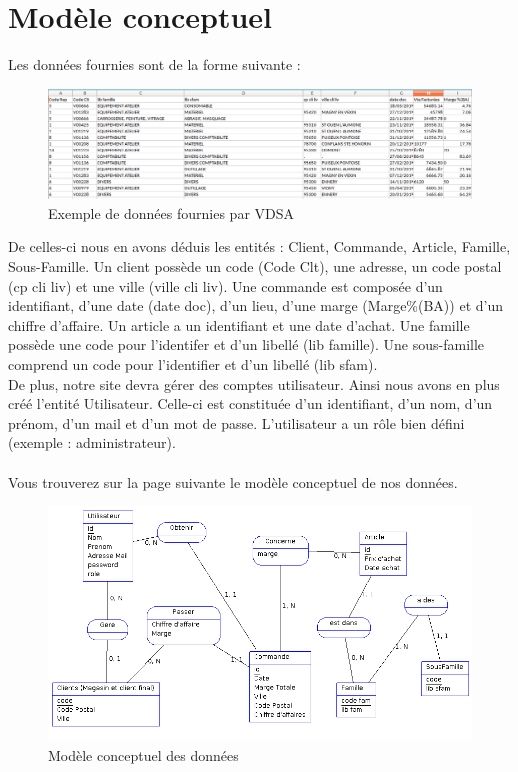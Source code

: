 \section{Modèle conceptuel}

Les données fournies sont de la forme suivante : \\
\begin{figure}[h]
	\begin{center}
		\includegraphics[scale=0.35]{img/data.png}
		\caption{Exemple de données fournies par VDSA}
	\end{center}
\end{figure}

De celles-ci nous en avons déduis les entités : Client, Commande, Article, Famille, Sous-Famille.
Un client possède un code (Code Clt), une adresse, un code postal (cp cli liv) et une ville (ville cli liv). Une commande est composée d'un identifiant, d'une date (date doc), d'un lieu, d'une marge (Marge\%(BA)) et d'un chiffre d'affaire. Un article a un identifiant et une date d'achat. Une famille possède une code pour l'identifer et d'un libellé (lib famille). Une sous-famille comprend un code pour l'identifier et d'un libellé (lib sfam).\\
De plus, notre site devra gérer des comptes utilisateur. Ainsi nous avons en plus créé l'entité Utilisateur. Celle-ci est constituée d'un identifiant, d'un nom, d'un prénom, d'un mail et d'un mot de passe. L'utilisateur a un rôle bien défini (exemple : administrateur).\\ \\
\noindent
Vous trouverez sur la page suivante le modèle conceptuel de nos données.

\begin{figure}[h]

\begin{center}
	\includegraphics[scale=0.5]{img/mcd.png}
	\caption{Modèle conceptuel des données}
\end{center}

\end{figure}
